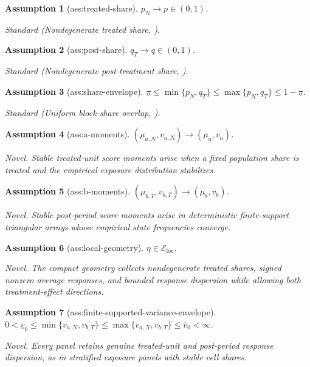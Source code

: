 \documentclass{article}
\newtheorem{assumption}{Assumption}
\begin{document}
\begin{assumption}[ass:treated-share]\label{ass:treated-share}
\(p_N\to p\in(0,1)\).
\par\smallskip\noindent\emph{Standard} (Nondegenerate treated share, \cite{CardosoFermanFernandes2026}).
\end{assumption}

\begin{assumption}[ass:post-share]\label{ass:post-share}
\(q_T\to q\in(0,1)\).
\par\smallskip\noindent\emph{Standard} (Nondegenerate post-treatment share, \cite{CardosoFermanFernandes2026}).
\end{assumption}

\begin{assumption}[ass:share-envelope]\label{ass:share-envelope}
\(\underline\pi\le\min\{p_N,q_T\}\le\max\{p_N,q_T\}\le1-\underline\pi\).
\par\smallskip\noindent\emph{Standard} (Uniform block-share overlap, \cite{BaiNg2021}).
\end{assumption}

\begin{assumption}[ass:a-moments]\label{ass:a-moments}
\((\mu_{a,N},v_{a,N})\to(\mu_a,v_a)\).
\par\smallskip\noindent\emph{Novel.} Stable treated-unit score moments arise when a fixed population share is treated and the empirical exposure distribution stabilizes.
\end{assumption}

\begin{assumption}[ass:b-moments]\label{ass:b-moments}
\((\mu_{b,T},v_{b,T})\to(\mu_b,v_b)\).
\par\smallskip\noindent\emph{Novel.} Stable post-period score moments arise in deterministic finite-support triangular arrays whose empirical state frequencies converge.
\end{assumption}

\begin{assumption}[ass:local-geometry]\label{ass:local-geometry}
\(\eta\in\mathcal E_{\mathrm{loc}}\).
\par\smallskip\noindent\emph{Novel.} The compact geometry collects nondegenerate treated shares, signed nonzero average responses, and bounded response dispersion while allowing both treatment-effect directions.
\end{assumption}

\begin{assumption}[ass:finite-supported-variance-envelope]\label{ass:finite-supported-variance-envelope}
\(0<\underline v_0\le\min\{v_{a,N},v_{b,T}\}\le\max\{v_{a,N},v_{b,T}\}\le\overline v_0<\infty\).
\par\smallskip\noindent\emph{Novel.} Every panel retains genuine treated-unit and post-period response dispersion, as in stratified exposure panels with stable cell shares.
\end{assumption}
\end{document}
